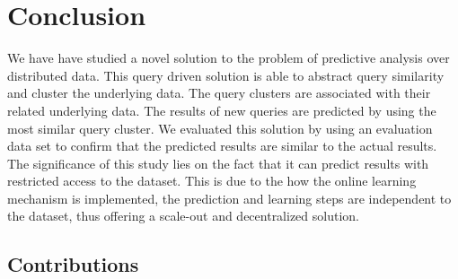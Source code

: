 \documentclass{lmproj}
\begin{document}
\chapter{Conclusion}
We have have studied a novel solution to the problem of predictive analysis over distributed data. This query driven solution is able to abstract query similarity and cluster the underlying data. The query clusters are associated with their related underlying data. The results of new queries are predicted by using the most similar query cluster. We evaluated this solution by using an evaluation data set to confirm that the predicted results are similar to the actual results. The significance of this study lies on the fact that it can predict results with restricted access to the dataset. This is due to the how the online learning mechanism is implemented, the prediction and learning steps are independent to the dataset, thus offering a scale-out and decentralized solution. 

\section{Contributions}




\end{document}
